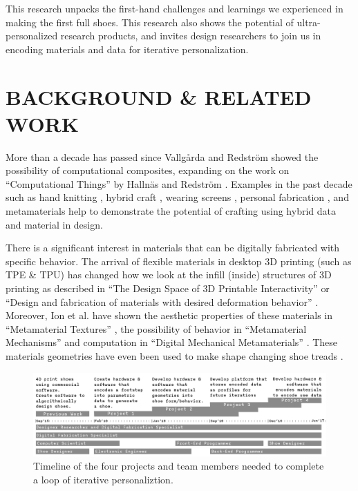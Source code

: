 This research unpacks the first-hand challenges and learnings we experienced in making the first full shoes. This research also shows the potential of ultra-personalized research products, and invites design researchers to join us in encoding materials and data for iterative personalization.

\section{BACKGROUND \& RELATED WORK }

More than a decade has passed since Vallg\aa rda and Redstr\"om \cite{Vallgarda2007} showed the possibility of computational composites, expanding on the work on ``Computational Things'' by Halln\"as and Redstr\"om \cite{Hallnas2002}. Examples in the past decade such as hand knitting \cite{Rosner2010}, hybrid craft \cite{Zoran2015}, wearing screens \cite{Devendorf2016}, personal fabrication \cite{Baudisch2017}, and metamaterials \cite{Ion2017} help to demonstrate the potential of crafting using hybrid data and material in design. 

There is a significant interest in materials that can be digitally fabricated with specific behavior. The arrival of flexible materials in desktop 3D printing (such as TPE \& TPU) has changed how we look at the infill (inside) structures of 3D printing as described in ``The Design Space of 3D Printable Interactivity'' \cite{Ballagas2018} or ``Design and fabrication of materials with desired deformation behavior'' \cite{Bickel2010}. Moreover, Ion et al. have shown the aesthetic properties of these materials in ``Metamaterial Textures'' \cite{Ion2018a}, the possibility of behavior in ``Metamaterial Mechanisms'' \cite{Ion2016} and computation in ``Digital Mechanical Metamaterials'' \cite{Ion2017}.  These materials geometries have even been used to make shape changing shoe treads \cite{Ion2018}.

\begin{figure}[htb]
\includegraphics[width=.9\textwidth]{Timeline}
\caption{Timeline of the four projects and team members needed to complete a loop of iterative personaliztion.  }
\label{fig:timeline}
\end{figure}

